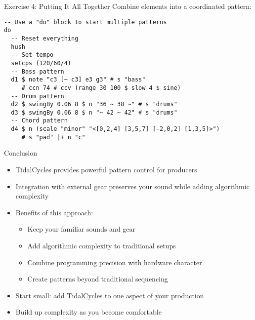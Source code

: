 \documentclass{beamer}
\begin{document}
\begin{frame}[fragile]{Exercise 4: Putting It All Together}
Combine elements into a coordinated pattern:

\begin{lstlisting}[style=tidal]
-- Use a "do" block to start multiple patterns
do
  -- Reset everything
  hush
  -- Set tempo
  setcps (120/60/4)
  -- Bass pattern
  d1 $ note "c3 [~ c3] e3 g3" # s "bass"
     # ccn 74 # ccv (range 30 100 $ slow 4 $ sine)
  -- Drum pattern
  d2 $ swingBy 0.06 8 $ n "36 ~ 38 ~" # s "drums"
  d3 $ swingBy 0.06 8 $ n "~ 42 ~ 42" # s "drums"
  -- Chord pattern
  d4 $ n (scale "minor" "<[0,2,4] [3,5,7] [-2,0,2] [1,3,5]>") 
     # s "pad" |+ n "c"
\end{lstlisting}
\end{frame}


\begin{frame}{Conclusion}
\begin{itemize}
    \item TidalCycles provides powerful pattern control for producers
    \item Integration with external gear preserves your sound while adding algorithmic complexity
    \item Benefits of this approach:
    \begin{itemize}
        \item Keep your familiar sounds and gear
        \item Add algorithmic complexity to traditional setups
        \item Combine programming precision with hardware character
        \item Create patterns beyond traditional sequencing
    \end{itemize}
    \item Start small: add TidalCycles to one aspect of your production
    \item Build up complexity as you become comfortable
\end{itemize}
\end{frame}
\end{document}
